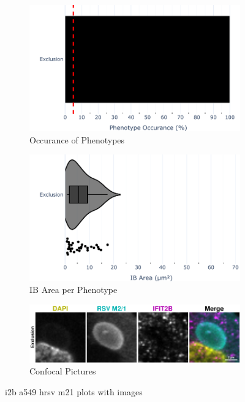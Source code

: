 \begin{figure}
    \begin{subfigure}{0.5\textwidth}
        \includegraphics[width=1\linewidth]{10. Chapter 5/Figs/01. Infection/02. IFIT2B/07. bar_i2b_a549-m21.pdf} 
        \caption[]{Occurance of Phenotypes}
    \end{subfigure}
    \begin{subfigure}{0.5\textwidth}
        \includegraphics[width=1\linewidth]{10. Chapter 5/Figs/01. Infection/02. IFIT2B/08. violin_i2b_a549-m21.pdf}
        \caption[]{IB Area per Phenotype}
    \end{subfigure}

    \begin{subfigure}{1\textwidth}
        \includegraphics[width=1\linewidth]{10. Chapter 5/Figs/01. Infection/02. IFIT2B/09. i2b a549 hrsv m21.pdf} 
        \caption[]{Confocal Pictures}
    \end{subfigure}
    \caption[i2b a549 hrsv m21 plots with images]{i2b a549 hrsv m21 plots with images}
    \label{fig:i2b a549 hrsv m21 plots with images}
\end{figure}

